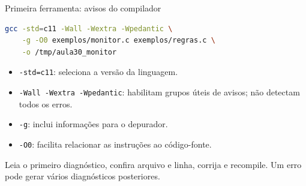\begin{frame}[fragile]{Primeira ferramenta: avisos do compilador}
\begin{lstlisting}[language=bash]
gcc -std=c11 -Wall -Wextra -Wpedantic \
    -g -O0 exemplos/monitor.c exemplos/regras.c \
    -o /tmp/aula30_monitor
\end{lstlisting}
\begin{itemize}
\item \texttt{-std=c11}: seleciona a versão da linguagem.
\item \texttt{-Wall -Wextra -Wpedantic}: habilitam grupos úteis de avisos; não detectam todos os erros.
\item \texttt{-g}: inclui informações para o depurador.
\item \texttt{-O0}: facilita relacionar as instruções ao código-fonte.
\end{itemize}
\small Leia o primeiro diagnóstico, confira arquivo e linha, corrija e recompile. Um erro pode gerar vários diagnósticos posteriores.
\end{frame}
